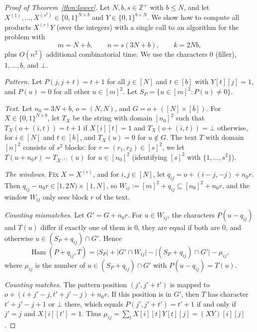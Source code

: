 \documentclass[11pt]{article}
\theoremstyle{definition}
\newcommand{\Z}{\mathbb{Z}}
\renewcommand{\O}{O}
\DeclareMathOperator{\Ham}{Ham}
\newcommand{\abs}[1]{\lvert #1 \rvert}
\begin{document}
\begin{proof}[Proof of Theorem~\ref{thm:lower}]
Let $N, b, s \in \Z^+$ with $b \le N$, and let $X^{(1)}, \dots, X^{(s^2)} \in \{0,1\}^{N \times b}$ and $Y \in \{0,1\}^{b \times N}$.
We show how to compute all products $X^{(r)}Y$ (over the integers) with a single call to an algorithm for the problem with
\[ m = N + b,\qquad n = s(3N + b), \qquad k = 2Nb, \]
plus $\O(n^2)$ additional combinatorial time. We use the characters $0$ (filler), $1, \dots, b$, and $\bot$.

\emph{Pattern.} Let $P(j, j + t) = t + 1$ for all $j \in [N]$ and $t \in [b]$ with $Y[t][j] = 1$, and $P(u) = 0$ for all other $u \in [m]^2$.
Let $S_P = \{u \in [m]^2 : P(u) \ne 0\}$.

\emph{Text.} Let $n_0 = 3N + b$, $o = (N,N)$, and $G = o + ([N] \times [b])$.
For $X \in \{0,1\}^{N\times b}$, let $T_X$ be the string with domain $[n_0]^2$ such that $T_X(o + (i,t)) = t+1$ if $X[i][t] = 1$ and $T_X(o + (i,t)) = \bot$ otherwise, for $i \in [N]$ and $t \in [b]$, and $T_X(u) = 0$ for $u \notin G$.
The text $T$ with domain $[n]^2$ consists of $s^2$ blocks: for $r = (r_1, r_2) \in [s]^2$, we let $T(u + n_0 r) = T_{X^{(r)}}(u)$ for $u \in [n_0]^2$ (identifying $[s]^2$ with $\{1, \dots, s^2\}$).

\emph{The windows.} Fix $X = X^{(r)}$, and for $i,j \in [N]$, let $q_{ij} = o + (i - j, -j) + n_0 r$.
Then $q_{ij} - n_0r \in [1, 2N) \times [1, N]$, so $W_{ij} := [m]^2 + q_{ij} \subseteq [n_0]^2 + n_0r$, and the window $W_{ij}$ only sees block $r$ of the text.

\emph{Counting mismatches.} Let $G' = G + n_0 r$.
For $u \in W_{ij}$, the characters $P(u - q_{ij})$ and $T(u)$ differ if exactly one of them is $0$, they are equal if both are $0$, and otherwise $u \in (S_P + q_{ij}) \cap G'$.
Hence
\begin{equation}\label{eq:lb}
\Ham(P + q_{ij}, T) = \abs{S_P} + \abs{G' \cap W_{ij}} - \abs{(S_P + q_{ij}) \cap G'} - \mu_{ij},
\end{equation}
where $\mu_{ij}$ is the number of $u \in (S_P + q_{ij}) \cap G'$ with $P(u - q_{ij}) = T(u)$.

\emph{Counting matches.} The pattern position $(j', j'+t')$ is mapped to $o + (i + j' - j, t' + j' - j) + n_0r$.
If this position is in $G'$, then $T$ has character $t' + j' - j + 1$ or $\bot$ there, which equals $P(j', j' + t') = t' + 1$ if and only if $j' = j$ and $X[i][t'] = 1$.
Thus $\mu_{ij} = \sum_{t} X[i][t]Y[t][j] = (XY)[i][j]$.


\end{proof}
\end{document}
